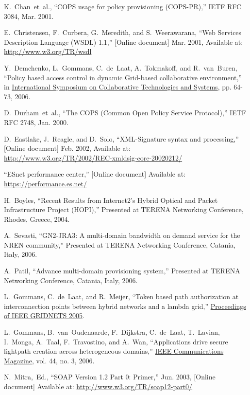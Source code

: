\documentclass[conference]{IEEEtran}
\begin{document}
\begin{thebibliography}{1}
K.~Chan~et~al., ``COPS usage for policy provisioning (COPS-PR),''
IETF RFC 3084, Mar. 2001.

E.~Christensen, F.~Curbera, G.~Meredith, and S.~Weerawarana,
``Web Services Description Language (WSDL) 1.1,'' [Online document] Mar. 2001,
Available at: \url{http://www.w3.org/TR/wsdl}

Y.~Demchenko, L.~Gommans, C.~de~Laat, A.~Tokmakoff, and R.~van~Buren,
``Policy based access control in dynamic Grid-based collaborative environment,''
in
\underline{International Symposium on Collaborative Technologies and Systems},
pp. 64-73, 2006.

D.~Durham~et~al.,
``The COPS (Common Open Policy Service Protocol),'' IETF RFC 2748, Jan. 2000.

D.~Eastlake, J.~Reagle, and D.~Solo,
``XML-Signature syntax and processing,'' [Online document] Feb. 2002,
Available at: \\
\url{http://www.w3.org/TR/2002/REC-xmldsig-core-20020212/}

``ESnet performance center,'' [Online document] Available at: \\
\url{https://performance.es.net/}

H.~Boyles,
``Recent Results from Internet2's Hybrid Optical and Packet Infrastructure Project (HOPI),''
Presented at TERENA Networking Conference, Rhodes, Greece, 2004.

A.~Sevasti,
``GN2-JRA3: A multi-domain bandwidth on demand service for the NREN community,''
Presented at TERENA Networking Conference, Catania, Italy, 2006.

A.~Patil,
``Advance multi-domain provisioning system,''
Presented at TERENA Networking Conference, Catania, Italy, 2006.

L.~Gommans, C.~de~Laat, and R.~Meijer,
``Token based path authorization at interconnection points between hybrid
networks and a lambda grid,''
\underline{Proceedings of IEEE GRIDNETS 2005}.

L.~Gommans, B.~van~Oudenaarde, F.~Dijkstra, C.~de~Laat, T.~Lavian, I.~Monga,
A.~Taal, F.~Travostino, and A.~Wan,
``Applications drive secure lightpath creation across heterogeneous domains,''
\underline{IEEE Communications Magazine},
vol. 44, no. 3, 2006.

N.~Mitra,~Ed.,
``SOAP Version 1.2 Part 0: Primer,'' Jun. 2003, [Online document] Available at:
\url{http://www.w3.org/TR/soap12-part0/}


\end{thebibliography}
\end{document}
